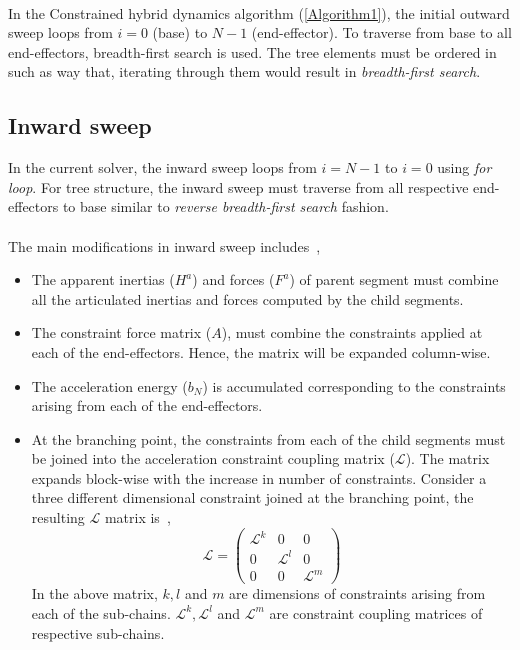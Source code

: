 \paragraph{}In the Constrained hybrid dynamics algorithm (\ref{Algorithm1}), the initial outward sweep loops from $i=0$ (base) to $N-1$ (end-effector). To traverse from base to all end-effectors, breadth-first search is used. The tree elements must be ordered in such as way that, iterating through them would result in \textit{breadth-first search}. 







\subsection{Inward sweep}
In the current solver, the inward sweep loops from $i = N-1$ to $i=0$ using \textit{for loop}. For tree structure, the inward sweep must traverse from all respective end-effectors to base similar to \textit{reverse breadth-first search} fashion. 


\paragraph{}The main modifications in inward sweep includes~\cite{shakhimardanov2015composable},
\begin{itemize}
	\item The apparent inertias ($H^a$) and forces ($F^a$) of parent segment must combine all the articulated inertias and forces computed by the child segments.
	\item The constraint force matrix ($A$), must combine the constraints applied at each of the end-effectors. Hence, the matrix will be expanded column-wise.
	\item The acceleration energy ($b_N$) is accumulated corresponding to the constraints arising from each of the end-effectors. 
	\item At the branching point, the constraints from each of the child segments must be joined into the acceleration constraint coupling matrix ($\mathcal{L}$). The matrix expands block-wise with the increase in number of constraints. Consider a three different dimensional constraint joined at the branching point, the resulting $\mathcal{L}$ matrix is~\cite{shakhimardanov2015composable},
	\begin{equation}
		\label{eq:L-matrix}
		\mathcal{L} = \begin{pmatrix}
		\mathcal{L}^k & 0 & 0\\
		0 & \mathcal{L}^l & 0\\
		0 & 0 & \mathcal{L}^m 
		\end{pmatrix}
	\end{equation} 
	In the above matrix, $k, l$ and $m$ are dimensions of constraints arising from each of the sub-chains. $\mathcal{L}^k, \mathcal{L}^l$ and $\mathcal{L}^m$ are constraint coupling matrices of respective sub-chains. 
\end{itemize}

